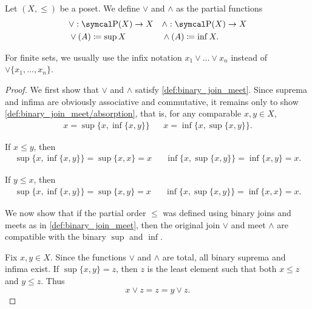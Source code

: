 \begin{definition}\label{def:join_meet}
  Let \( (X, \leq) \) be a poset. We define  \( \lor \) and  \( \land \) as the partial functions
  \begin{align*}
    &\lor: \Power(X) \to X
    &&\land: \Power(X) \to X
    \\
    &\lor(A) \coloneqq \sup X
    &&\land(A) \coloneqq \inf X.
  \end{align*}

  For finite sets, we usually use the infix notation \( x_1 \lor \ldots \lor x_n \) instead of \( \lor \{ x_1, \ldots, x_n \} \).
\end{definition}
\begin{proof}
  We first show that \( \lor \) and \( \land \) satisfy \cref{def:binary_join_meet}. Since suprema and infima are obviously associative and commutative, it remains only to show \ref{def:binary_join_meet/absorption}, that is, for any comparable \( x, y \in X \),
  \begin{align*}
    x = \sup \{x, \inf \{ x, y \} \}
    &&
    x = \inf \{x, \sup \{ x, y \} \}.
  \end{align*}

  If \( x \leq y \), then
  \begin{align*}
    \sup \{ x, \inf \{ x, y \} \} = \sup \{ x, x \} = x
    &&
    \inf \{ x, \sup \{ x, y \} \} = \inf \{ x, y \} = x.
  \end{align*}

  If \( y \leq x \), then
  \begin{align*}
    \sup \{ x, \inf \{ x, y \} \} = \sup \{ x, y \} = x
    &&
    \inf \{ x, \sup \{ x, y \} \} = \inf \{ x, x \} = x.
  \end{align*}

  We now show that if the partial order \( \leq \) was defined using binary joins and meets as in \cref{def:binary_join_meet}, then the original join \( \lor \) and meet \( \land \) are compatible with the binary \( \sup \) and \( \inf \).

  Fix \( x, y \in X \). Since the functions \( \lor \) and \( \land \) are total, all binary suprema and infima exist. If \( \sup \{ x, y \} = z \), then \( z \) is the least element such that both \( x \leq z \) and \( y \leq z \). Thus
  \begin{equation*}
    x \lor z = z = y \lor z.
  \end{equation*}


\end{proof}
